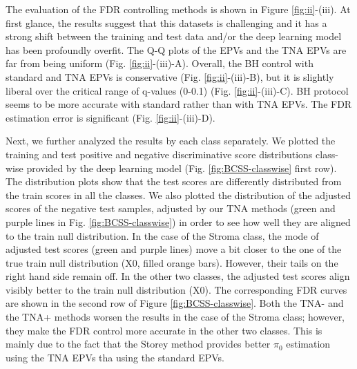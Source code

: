 \documentclass{article}
\begin{document}
The evaluation of the FDR controlling methods is shown in Figure \ref{fig:ii}-(iii). At first glance, the results suggest that this datasets is challenging and it  has a strong shift between the training and test data and/or the deep learning model has been profoundly overfit. The Q-Q plots of the EPVs and the TNA EPVs are far from being uniform (Fig. \ref{fig:ii}-(iii)-A). Overall, the BH control with standard and TNA EPVs is conservative (Fig. \ref{fig:ii}-(iii)-B), but it is slightly liberal over the critical range of q-values (0-0.1) (Fig. \ref{fig:ii}-(iii)-C). BH protocol seems to be more accurate with standard rather than with TNA EPVs. The FDR estimation error is significant (Fig. \ref{fig:ii}-(iii)-D). 

Next, we further analyzed the results by each class separately. We plotted the training and test positive and negative discriminative score distributions class-wise provided by the deep learning model (Fig. \ref{fig:BCSS-classwise} first row). The distribution plots show that the test scores are differently distributed from the train scores in all the classes. We also plotted the distribution of the adjusted scores of the negative test samples, adjusted by our TNA methods (green and purple lines in Fig. \ref{fig:BCSS-classwise}) in order to see how well they are aligned to the train null distribution.  In the case of the Stroma class, the mode of adjusted test scores (green and purple lines) move a bit closer to the one of the true train null distribution (X0, filled orange bars). However, their tails on the right hand side remain off. In the other two classes, the adjusted test scores align visibly better to the train null distribution (X0). The corresponding FDR curves are shown in the second row of Figure \ref{fig:BCSS-classwise}. Both the TNA- and the TNA+ methods worsen the results in the case of the Stroma class; however, they make the FDR control more accurate in the other two classes. This is mainly due to the fact that the Storey method provides better $\pi_0$ estimation using the TNA EPVs tha using the standard EPVs. 
\end{document}
